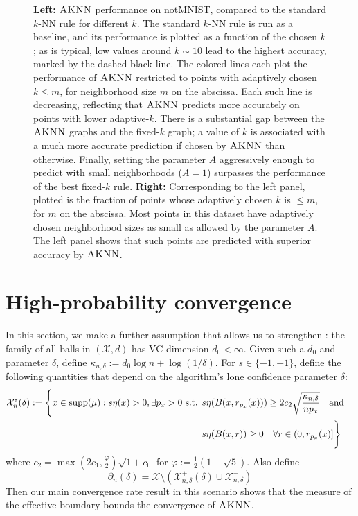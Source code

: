 \documentclass{article}
\def\X{{\mathcal X}}
\def\supp{{\rm supp}}
\newcommand{\algname}{\textsc{AKNN}}
\begin{document}
\begin{figure}
  \caption{\textbf{Left: } $\algname$ performance on notMNIST, compared to the standard $k$-NN rule for different $k$. The standard $k$-NN rule is run as a baseline, and its performance is plotted as a function of the chosen $k$; as is typical, low values around $k \sim 10$ lead to the highest accuracy, marked by the dashed black line. The colored lines each plot the performance of $\algname$ restricted to points with adaptively chosen $k \leq m$, for neighborhood size $m$ on the abscissa. Each such line is decreasing, reflecting that $\algname$ predicts more accurately on points with lower adaptive-$k$. There is a substantial gap between the $\algname$ graphs and the fixed-$k$ graph; a value of $k$ is associated with a much more accurate prediction if chosen by $\algname$ than otherwise. Finally, setting the parameter $A$ aggressively enough to predict with small neighborhoods ($A=1$) surpasses the performance of the best fixed-$k$ rule. \textbf{Right: } Corresponding to the left panel, plotted is the fraction of points whose adaptively chosen $k$ is $\leq m$, for $m$ on the abscissa. Most points in this dataset have adaptively chosen neighborhood sizes as small as allowed by the parameter $A$. The left panel shows that such points are predicted with superior accuracy by $\algname$.}
  \label{fig:aknnvsknn}
\end{figure}




















\appendix

\section{High-probability convergence}

In this section, we make a further assumption that allows us to strengthen : 
the family of all balls in $(\X, d)$ has VC dimension $d_0 < \infty$. 
Given such a $d_0$ and parameter $\delta$, define $\kappa_{n, \delta} := d_0 \log n + \log (1/\delta)$. 
For $s \in \{ -1, +1 \}$, define the following quantities that depend on the algorithm's lone confidence parameter $\delta$:
\begin{align*}
\X^{s}_n (\delta)
:= \Bigg\{
x \in \supp(\mu) : s \eta(x) > 0 , \exists p_x > 0 \text{ s.t. } 
&s \eta(B(x,r_{p_x}(x))) \geq 2 c_2 \sqrt{\frac{ \kappa_{n, \delta} }{n p_x}}
\quad\text{and}\quad \\
&s \eta(B(x,r)) \geq 0 \quad\forall r \in (0, r_{p_x}(x)]
\Bigg\}
\end{align*}
where $c_2 = \max(2c_1, \frac{\varphi}{2} ) \sqrt{1 + c_0}$ for $\varphi := \frac{1}{2} (1 + \sqrt{5})$.
Also define 
$$ \partial_n (\delta) = \X \setminus (\X^+_{n,\delta} (\delta) \cup \X^-_{n,\delta}) $$
Then our main convergence rate result in this scenario shows that the measure of the effective boundary bounds the convergence of $\algname$.
\end{document}

